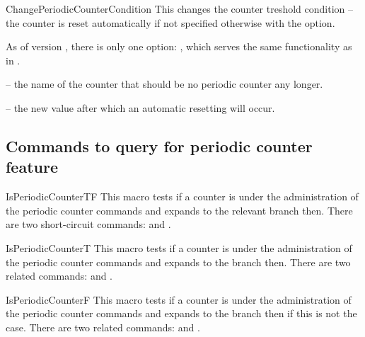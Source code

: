 \documentclass[12pt,a4paper,oneside]{article}
\makeatletter
\newcommand{\chdocextractversion}[1]{%
  \@nameuse{#1}%
}
\newcommand{\CHDocNew}[1]{%
  \tcbdocmarginnote[doclang/new={N},
  colframe=blue,
  halign=left,
  colback={blue!20!white},
  fontupper={\tiny}
  ]{%
    \chdocextractversion{xassoccntversion#1}%
  }%
}
\def\packageversion{\xassoccntpackageversion}%
\makeatother
\begin{document}
\begin{docCommand}[before={\CHDocNew{0.9}}]{ChangePeriodicCounterCondition}{}
This changes the counter treshold condition -- the counter is reset automatically if not specified otherwise with the  option. 

\begin{codeoptionsenum}
\item {} 
  
  As of version \packageversion, there is only one option: , which serves the same functionality as in . 
\item {} -- the name of the counter that should be no periodic counter any longer. 
\item {} -- the new value after which an automatic resetting will occur. 

\end{codeoptionsenum}

\end{docCommand}

\subsection{Commands to query for periodic counter feature}


\begin{docCommand}[after={\CHDocNew{0.9}\par}]{IsPeriodicCounterTF}{}
This macro tests if a counter is under the administration of the periodic counter commands and expands to the relevant branch then. There are two short-circuit commands:  and .
\end{docCommand}

\begin{docCommand}[before={\CHDocNew{0.9}}]{IsPeriodicCounterT}{}
This macro tests if a counter is under the administration of the periodic counter commands and expands to the  branch then. There are two related commands:  and .
\end{docCommand}

\begin{docCommand}[before={\CHDocNew{0.9}}]{IsPeriodicCounterF}{}
This macro tests if a counter is under the administration of the periodic counter commands and expands to the  branch then if this is not the case. There are two related commands:  and .
\end{docCommand}
\end{document}
